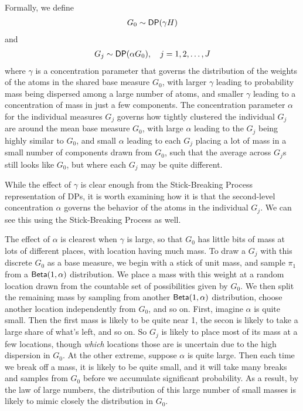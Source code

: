 Formally, we define
\begin{align}
  G_0 \sim \mathsf{DP}(\gamma H)
\end{align}
and
\begin{align}
  G_j \sim \mathsf{DP}(\alpha G_0), \quad j = 1, 2, \dots, J
\end{align}
where $\gamma$ is a concentration parameter that governs the
distribution of the weights of the atoms in the shared base measure
$G_0$, with larger $\gamma$ leading to probability mass being
dispersed among a large number of atoms, and smaller $\gamma$ leading
to a concentration of mass in just a few components.  The
concentration parameter $\alpha$ for the individual measures $G_j$
governs how tightly clustered the individual $G_j$ are around the mean
base measure $G_0$, with large $\alpha$ leading to the $G_j$ being
highly similar to $G_0$, and small $\alpha$ leading to each $G_j$
placing a lot of mass in a small number of components drawn from
$G_0$, such that the average across $G_j$s still looks like $G_0$, 
but where each $G_j$ may be quite different.

While the effect of $\gamma$ is clear enough from the Stick-Breaking
Process representation of DPs, it is worth examining how it is that
the second-level concentration $\alpha$ governs the behavior of the
atoms in the individual $G_j$.  We can see this using the
Stick-Breaking Process as well.

The effect of $\alpha$ is clearest when $\gamma$ is large, so that
$G_0$ has little bits of mass at lots of different places, with
location having much mass.  To draw a $G_j$ with this discrete $G_0$ 
as a base measure, we begin with a stick of unit mass, and sample $\pi_1$ from a
$\mathsf{Beta}(1,\alpha)$ distribution.  We place a mass with this weight at
a random location drawn from the countable set of possibilities given
by $G_0$.  We then split the remaining mass by sampling from another
$\mathsf{Beta}(1,\alpha)$ distribution, choose another location independently
from $G_0$, and so on.  First, imagine $\alpha$ is quite small.  Then
the first mass is likely to be quite near 1, the secon is likely to
take a large share of what's left, and so on.  So $G_j$ is likely to
place most of its mass at a few locations, though {\em which}
locations those are is uncertain due to the high dispersion in $G_0$.
At the other extreme, suppose $\alpha$ is quite large.  Then each time
we break off a mass, it is likely to be quite small, and it will take
many breaks and samples from $G_0$ before we accumulate significant
probability.  As a result, by the law of large numbers, 
the distribution of this large number of small masses is likely to
mimic closely the distribution in $G_0$.

